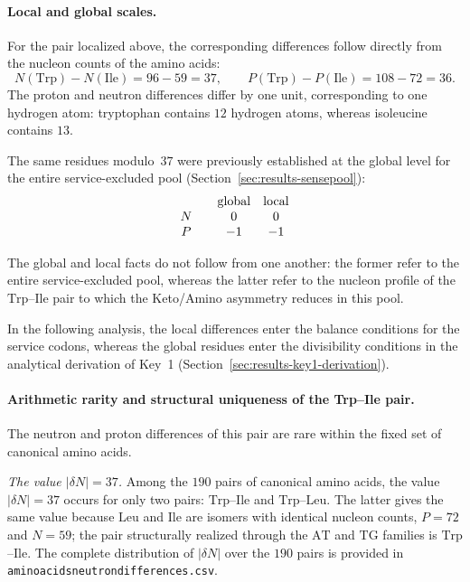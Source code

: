 \documentclass[11pt,a4paper]{article}
\renewcommand{\_}{\origunderscore\allowbreak}
\begin{document}
\paragraph{Local and global scales.}
For the pair localized above, the corresponding differences follow
directly from the nucleon counts of the amino acids:
\[
N(\mathrm{Trp})-N(\mathrm{Ile})=96-59=37,
\qquad
P(\mathrm{Trp})-P(\mathrm{Ile})=108-72=36.
\]
The proton and neutron differences differ by one unit, corresponding
to one hydrogen atom: tryptophan contains $12$ hydrogen atoms, whereas
isoleucine contains $13$.

The same residues modulo~$37$ were previously established at the
global level for the entire service-excluded pool
(Section~\ref{sec:results-sensepool}):
\[
\begin{array}{c@{\qquad}cc}
 & \text{global} & \text{local} \\
N &  0 &  0 \\
P & -1 & -1
\end{array}
\]

The global and local facts do not follow from one another: the former
refer to the entire service-excluded pool, whereas the latter
refer to the nucleon profile of the $\mathrm{Trp}$--$\mathrm{Ile}$
pair to which the Keto/Amino asymmetry reduces in this pool.

In the following analysis, the local differences enter the balance
conditions for the service codons, whereas the global residues enter
the divisibility conditions in the analytical derivation of Key~1
(Section~\ref{sec:results-key1-derivation}).

\paragraph{Arithmetic rarity and structural uniqueness of the
Trp--Ile pair.}
The neutron and proton differences of this pair are rare within the
fixed set of canonical amino acids.

\emph{The value $|\delta N| = 37$.} Among the $190$ pairs of
canonical amino acids, the value $|\delta N| = 37$ occurs for only two
pairs: $\mathrm{Trp}$--$\mathrm{Ile}$ and
$\mathrm{Trp}$--$\mathrm{Leu}$. The latter gives the same value
because $\mathrm{Leu}$ and $\mathrm{Ile}$ are isomers with identical
nucleon counts, $P = 72$ and $N = 59$; the pair structurally realized
through the $\mathrm{AT}$ and $\mathrm{TG}$ families is
$\mathrm{Trp}$--$\mathrm{Ile}$. The complete distribution of
$|\delta N|$ over the $190$ pairs is provided in
\texttt{amino\_acids\_neutron\_differences.csv}.
\end{document}
